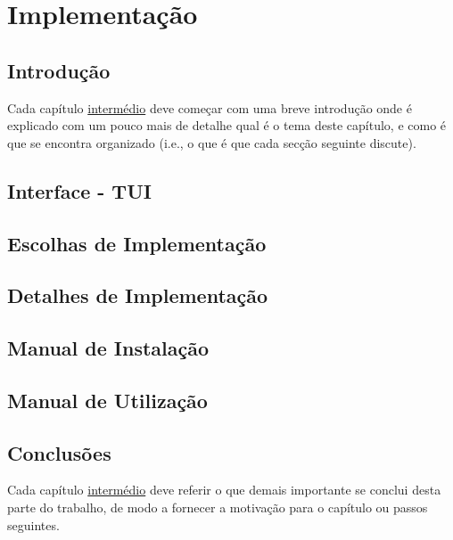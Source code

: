 \chapter{Implementação}
\label{chap:tecno-ferra}

\section{Introdução}
\label{chap3:sec:intro}
Cada capítulo \underline{intermédio} deve começar com uma breve introdução onde é explicado com um pouco mais de detalhe qual é o tema deste capítulo, e como é que se encontra organizado (i.e., o que é que cada secção seguinte discute).

\section{Interface - \ac{TUI}}
\label{chap3:sec:tui}
\section{Escolhas de Implementação}
\label{chap3:sec:escolhas}
\section{Detalhes de Implementação}
\label{chap3:sec:detalhes}
\section{Manual de Instalação}
\label{chap3:sec:maninstall}
\section{Manual de Utilização}
\label{chap3:sec:manuser}

\section{Conclusões}
\label{chap3:sec:concs}
Cada capítulo \underline{intermédio} deve referir o que demais importante se conclui desta parte do trabalho, de modo a fornecer a motivação para o capítulo ou passos seguintes.